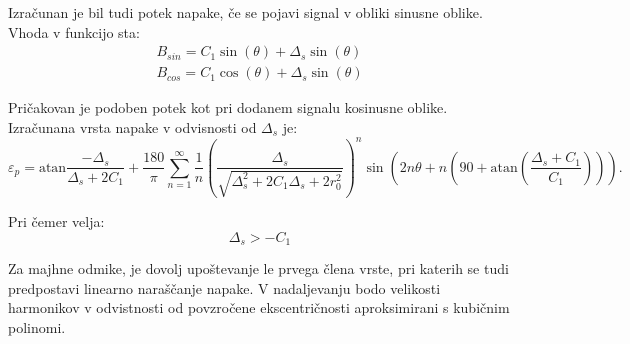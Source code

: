 Izračunan je bil tudi potek napake, če se pojavi signal v obliki sinusne oblike. Vhoda v funkcijo sta:
\begin{eqnarray}
\label{ys_analit}
B_{sin} = C_1 \sin(\theta) + \Delta_s \sin(\theta) \\
B_{cos} = C_1 \cos(\theta) + \Delta_s \sin(\theta)
\end{eqnarray}

Pričakovan je podoben potek kot pri dodanem signalu kosinusne oblike.
Izračunana vrsta napake v odvisnosti od  $\Delta_s$ je:
\begin{equation}
	\label{vrsta:ys}
	\varepsilon_p = \mathrm{atan}\frac{-\Delta_s}{\Delta_s+2C_1}+\frac{180}{\pi} \sum_{n=1}^{\infty}\frac{1}{n} (\frac{\Delta_s}{\sqrt{\Delta_s^2+2 C_1 \Delta_s+2r_0^2}})^n
	\sin (2n \theta+n (90+ \mathrm{ atan}(\frac{\Delta_s+C_1}{C_1}))).
\end{equation}

 Pri čemer velja:
$$\Delta_s > -C_1$$

Za majhne odmike, je dovolj upoštevanje le prvega člena vrste, pri katerih se tudi predpostavi linearno naraščanje napake. V nadaljevanju bodo velikosti harmonikov v odvistnosti od povzročene ekscentričnosti
aproksimirani s kubičnim polinomi.